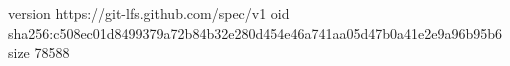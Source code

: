 version https://git-lfs.github.com/spec/v1
oid sha256:c508ec01d8499379a72b84b32e280d454e46a741aa05d47b0a41e2e9a96b95b6
size 78588
